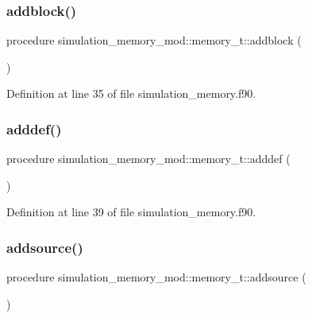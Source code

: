 \subsubsection{\texorpdfstring{addblock()}{addblock()}}
{\footnotesize\ttfamily procedure simulation\+\_\+memory\+\_\+mod\+::memory\+\_\+t\+::addblock (\begin{DoxyParamCaption}{ }\end{DoxyParamCaption})\hspace{0.3cm}{\ttfamily [private]}}



Definition at line 35 of file simulation\+\_\+memory.\+f90.

\mbox{\label{structsimulation__memory__mod_1_1memory__t_a911dd049cf53d2ed80069303ddb3ed9e}} 
\subsubsection{\texorpdfstring{adddef()}{adddef()}}
{\footnotesize\ttfamily procedure simulation\+\_\+memory\+\_\+mod\+::memory\+\_\+t\+::adddef (\begin{DoxyParamCaption}{ }\end{DoxyParamCaption})\hspace{0.3cm}{\ttfamily [private]}}



Definition at line 39 of file simulation\+\_\+memory.\+f90.

\mbox{\label{structsimulation__memory__mod_1_1memory__t_a29800fdc8fd46bbe3d3217b2a3fb3da9}} 
\subsubsection{\texorpdfstring{addsource()}{addsource()}}
{\footnotesize\ttfamily procedure simulation\+\_\+memory\+\_\+mod\+::memory\+\_\+t\+::addsource (\begin{DoxyParamCaption}{ }\end{DoxyParamCaption})\hspace{0.3cm}{\ttfamily [private]}}



